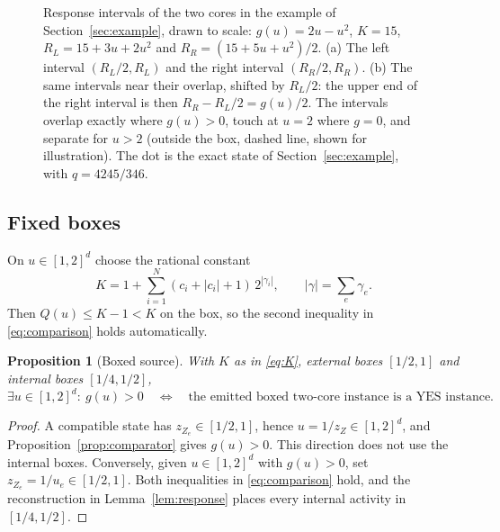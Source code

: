 \documentclass[11pt,a4paper]{article}
\theoremstyle{plain}
\newtheorem{proposition}[theorem]{Proposition}
\theoremstyle{definition}
\theoremstyle{remark}
\begin{document}
\begin{figure}[t]
\caption{Response intervals of the two cores in the example of Section~\ref{sec:example}, drawn to scale: $g(u)=2u-u^2$, $K=15$, $R_L=15+3u+2u^2$ and $R_R=(15+5u+u^2)/2$. (a) The left interval $(R_L/2,R_L)$ and the right interval $(R_R/2,R_R)$. (b) The same intervals near their overlap, shifted by $R_L/2$: the upper end of the right interval is then $R_R-R_L/2=g(u)/2$. The intervals overlap exactly where $g(u)>0$, touch at $u=2$ where $g=0$, and separate for $u>2$ (outside the box, dashed line, shown for illustration). The dot is the exact state of Section~\ref{sec:example}, with $q=4245/346$.}
\label{fig:intervals}
\end{figure}

\subsection{Fixed boxes}

On $u\in[1,2]^d$ choose the rational constant
\begin{equation}\label{eq:K}
 K=1+\sum_{i=1}^N(c_i+|c_i|+1)\,2^{|\gamma_i|},\qquad|\gamma|=\textstyle\sum_e\gamma_e .
\end{equation}
Then $Q(u)\le K-1<K$ on the box, so the second inequality in \eqref{eq:comparison} holds automatically.

\begin{proposition}[Boxed source]\label{prop:boxed}
With $K$ as in \eqref{eq:K}, external boxes $[1/2,1]$ and internal boxes $[1/4,1/2]$,
\begin{equation}\label{eq:boxediff}
 \exists u\in[1,2]^d:\ g(u)>0\quad\Longleftrightarrow\quad\text{the emitted boxed two-core instance is a YES instance.}
\end{equation}
\end{proposition}

\begin{proof}
A compatible state has $z_{Z_e}\in[1/2,1]$, hence $u=1/z_Z\in[1,2]^d$, and Proposition~\ref{prop:comparator} gives $g(u)>0$. This direction does not use the internal boxes. Conversely, given $u\in[1,2]^d$ with $g(u)>0$, set $z_{Z_e}=1/u_e\in[1/2,1]$. Both inequalities in \eqref{eq:comparison} hold, and the reconstruction in Lemma~\ref{lem:response} places every internal activity in $[1/4,1/2]$.
\end{proof}
\end{document}

